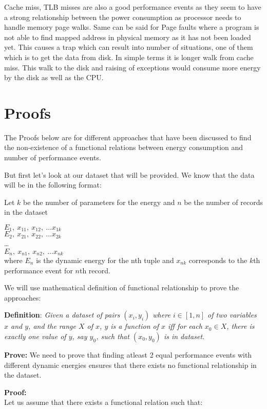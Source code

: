 Cache miss, TLB misses are also a good performance events as they seem to have a strong relationship between the power consumption as processor needs to handle memory page walks. Same can be said for Page faults where a program is not able to find mapped address in physical memory as it has not been loaded yet. This causes a trap which can result into number of situations, one of them which is to get the data from disk. In simple terms it is longer walk from cache miss. This walk to the disk and raising of exceptions would consume more energy by the disk as well as the CPU.

\section{Proofs}

The Proofs below are for different approaches that have been discussed to find the non-existence of a functional relations between energy consumption and number of performance events.

But first let's look at our dataset that will be provided.
We know that the data will be in the following format:

Let \(k\) be the number of parameters for the energy and \(n\) be the number of records in the dataset

\(E_1,\ x_{11},\ x_{12},\ \ldots x_{1k}\)\\
\(E_2,\ x_{21},\ x_{22},\ \ldots x_{2k}\)\\
\ldots\\
\(E_n,\ x_{n1},\ x_{n2},\ \ldots x_{nk}\)\\
where \(E_n\) is the dynamic energy for the nth tuple and \(x_{nk}\) corresponds to the \(k\)th performance event for \(n\)th record.

We will use mathematical definition of functional relationship to prove the approaches:

\textbf{Definition}: \textit{Given a dataset of pairs \((x_i, y_i)\) where \(i \in [1, n]\) of two variables \(x\) and \(y\), and the range \(X\) of \(x\), \(y\) is a function of \(x\) iff for each \(x_0 \in X\), there is exactly one value of \(y\), say \(y_0\), such that \((x_0, y_0)\) is in dataset.}~\cite{zembowicz1993testing}

\textbf{Prove:} We need to prove that finding atleast 2 equal performance events with different dynamic energies ensures that there exists no functional relationship in the dataset.

\textbf{Proof:}\\
Let us assume that there exists a functional relation such that:

